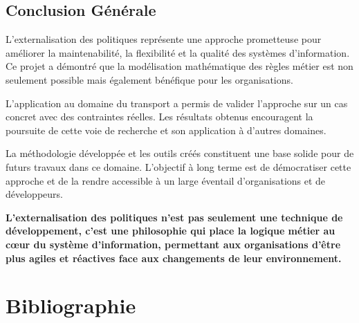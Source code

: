 \documentclass[12pt,a4paper]{article}
\begin{document}
    \subsection{Conclusion Générale}

    L'externalisation des politiques représente une approche prometteuse pour améliorer la maintenabilité, la flexibilité et la qualité des systèmes d'information. Ce projet a démontré que la modélisation mathématique des règles métier est non seulement possible mais également bénéfique pour les organisations.

    L'application au domaine du transport a permis de valider l'approche sur un cas concret avec des contraintes réelles. Les résultats obtenus encouragent la poursuite de cette voie de recherche et son application à d'autres domaines.

    La méthodologie développée et les outils créés constituent une base solide pour de futurs travaux dans ce domaine. L'objectif à long terme est de démocratiser cette approche et de la rendre accessible à un large éventail d'organisations et de développeurs.

    \begin{tcolorbox}[colback=primaryblue!5,colframe=primaryblue,title=Message Final]
        \textbf{L'externalisation des politiques n'est pas seulement une technique de développement, c'est une philosophie qui place la logique métier au cœur du système d'information, permettant aux organisations d'être plus agiles et réactives face aux changements de leur environnement.}
    \end{tcolorbox}

    \newpage

    \section{Bibliographie}
\end{document}
